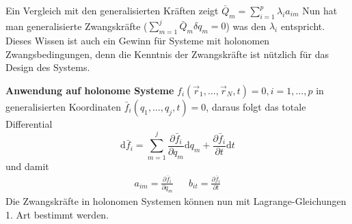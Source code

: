 \documentclass[oneside]{book}
\theoremstyle{definition}
\renewcommand{\d}{\mathrm d}
\newcommand{\ffpartial}[2]{\frac{\partial #1}{\partial #2}}
\newcommand{\vardots}[2]{#1_1, \dots, #1_#2}
\begin{document}
Ein Vergleich mit den generalisierten Kräften zeigt $\bar{Q}_m = \sum_{i=1}^{p} \lambda_i a_{im}$
Nun hat man generalisierte Zwangskräfte ($\sum_{m=1}^j \bar{Q}_m \delta q_m = 0$) was den $\lambda_i$ entspricht.
Dieses Wissen ist auch ein Gewinn für Systeme mit holonomen Zwangsbedingungen, denn die Kenntnis der Zwangskräfte ist nützlich für das Design des Systems.

\textbf{Anwendung auf holonome Systeme}
$f_i(\vardots{\vec{r}}{N}, t) = 0, i = 1, \dots, p$ in generalisierten Koordinaten $\bar{f}_i(\vardots{q}{j}, t) = 0$, daraus folgt das totale Differential 
$$\d \bar{f}_i = \sum_{m=1}^j \ffpartial{\bar{f}_i}{q_m} \d q_m + \ffpartial{\bar{f}_i}{t} \d t$$
und damit 
\begin{align*}
	a_{im} = \ffpartial{\bar{f}_i}{q_m}& &b_{it} = \ffpartial{\bar{f}_i}{t}
\end{align*}
Die Zwangskräfte in holonomen Systemen können nun mit Lagrange-Gleichungen 1. Art bestimmt werden.
\end{document}
